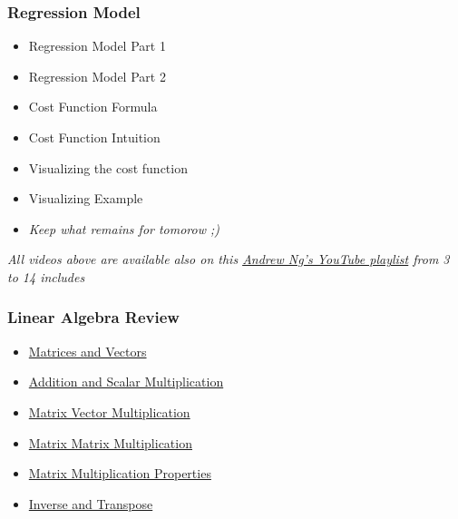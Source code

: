 \subsubsection*{Regression Model}  
\begin{itemize}
  \item Regression Model Part 1
  \item Regression Model Part 2
  \item Cost Function Formula
  \item Cost Function Intuition
  \item Visualizing the cost function
  \item Visualizing Example
  \item \textit{Keep what remains for tomorow ;)}
\end{itemize}

\emph{All videos above are available also on this \href{https://youtube.com/playlist?list=PLkDaE6sCZn6FNC6YRfRQc_FbeQrF8BwGI&feature=shared}{Andrew Ng's YouTube playlist} from 3 to 14 includes}

\subsubsection*{Linear Algebra Review}
\begin{itemize}
  \item \href{https://www.youtube.com/watch?v=XMB__E658fQ}{Matrices and Vectors}
  \item \href{https://www.youtube.com/watch?v=k1JGJhUGmBE}{Addition and Scalar Multiplication}
  \item \href{https://www.youtube.com/watch?v=VIfykceJoZI}{Matrix Vector Multiplication}
  \item \href{https://www.youtube.com/watch?v=JHZKyt0m1kc}{Matrix Matrix Multiplication}
  \item \href{https://www.youtube.com/watch?v=wqM7O_ZUtCc}{Matrix Multiplication Properties}
  \item \href{https://www.youtube.com/watch?v=IUf8HDyUeY0}{Inverse and Transpose}
\end{itemize}
